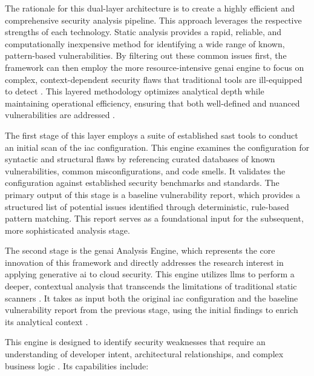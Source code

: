 The rationale for this dual-layer architecture is to create a highly efficient and comprehensive security analysis pipeline. This approach leverages the respective strengths of each technology. Static analysis provides a rapid, reliable, and computationally inexpensive method for identifying a wide range of known, pattern-based vulnerabilities. By filtering out these common issues first, the framework can then employ the more resource-intensive \gls{genai} engine to focus on complex, context-dependent security flaws that traditional tools are ill-equipped to detect \cite{zhang_empirical_2024}. This layered methodology optimizes analytical depth while maintaining operational efficiency, ensuring that both well-defined and nuanced vulnerabilities are addressed \cite{khanna_enhancing_2024}.

The first stage of this layer employs a suite of established \gls{sast} tools to conduct an initial scan of the \gls{iac} configuration. This engine examines the configuration for syntactic and structural flaws by referencing curated databases of known vulnerabilities, common misconfigurations, and code smells. It validates the configuration against established security benchmarks and standards. The primary output of this stage is a baseline vulnerability report, which provides a structured list of potential issues identified through deterministic, rule-based pattern matching. This report serves as a foundational input for the subsequent, more sophisticated analysis stage.

The second stage is the \gls{genai} Analysis Engine, which represents the core innovation of this framework and directly addresses the research interest in applying generative \gls{ai} to cloud security. This engine utilizes \glspl{llm} to perform a deeper, contextual analysis that transcends the limitations of traditional static scanners \cite{noauthor_artificial_2025}. It takes as input both the original \gls{iac} configuration and the baseline vulnerability report from the previous stage, using the initial findings to enrich its analytical context \cite{noauthor_towards_2025}.

This engine is designed to identify security weaknesses that require an understanding of developer intent, architectural relationships, and complex business logic \cite{noseevich_towards_2015}. Its capabilities include:

